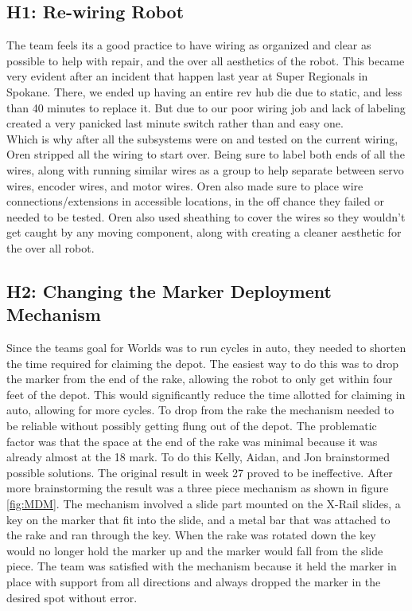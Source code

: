 \documentclass{article}
\begin{document}
\subsection{H1: Re-wiring Robot}

The team feels its a good practice to have wiring as organized and clear as possible to help with repair, and the over all aesthetics of the robot. This became very evident after an incident that happen last year at Super Regionals in Spokane. There, we ended up having an entire rev hub die due to static, and less than 40 minutes to replace it. But due to our poor wiring job and lack of labeling created a very panicked last minute switch rather than and easy one. \\

Which is why after all the subsystems were on and tested on the current wiring, Oren stripped all the wiring to start over. Being sure to label both ends of all the wires, along with running similar wires as a group to help separate between servo wires, encoder wires, and motor wires. Oren also made sure to place wire connections/extensions in accessible locations, in the off chance they failed or needed to be tested. Oren also used sheathing to cover the wires so they wouldn't get caught by any moving component, along with creating a cleaner aesthetic for the over all robot. 

\subsection{H2: Changing the Marker Deployment Mechanism}

Since the teams goal for Worlds was to run cycles in auto, they needed to shorten the time required for claiming the depot. The easiest way to do this was to drop the marker from the end of the rake, allowing the robot to only get within four feet of the depot. This would significantly reduce the time allotted for claiming in auto, allowing for more cycles. To drop from the rake the mechanism needed to be reliable without possibly getting flung out of the depot. The problematic factor was that the space at the end of the rake was minimal because it was already almost at the 18 mark. To do this Kelly, Aidan, and Jon brainstormed possible solutions. The original result in week 27 proved to be ineffective. After more brainstorming the result was a three piece mechanism as shown in figure \ref{fig:MDM}. The mechanism involved a slide part mounted on the X-Rail slides, a key on the marker that fit into the slide, and a metal bar that was attached to the rake and ran through the key. When the rake was rotated down the key would no longer hold the marker up and the marker would fall from the slide piece. The team was satisfied with the mechanism because it held the marker in place with support from all directions and always dropped the marker in the desired spot without error.
\end{document}
